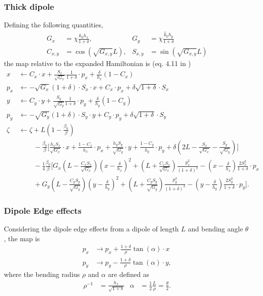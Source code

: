 \subsubsection{Thick dipole}
Defining the following quantities,
\begin{align}
  G_x&= \chi \frac{k_0 h_x}{1+\delta}, & G_y&= \chi \frac{ \hat k_0 h_y}{1+\delta} \\
  C_{x,y}&=\cos(\sqrt{G_{x,y}}L), & S_{x,y}&=\sin(\sqrt{G_{x,y}}L)
\end{align}
the map relative to the expanded Hamiltonian is (eq. 4.11 in \cite{barber87})
\begin{align}
  x   &\leftarrow C_x \cdot x + \frac{S_x}{\sqrt{G_x}}\frac{1}{1+\delta} \cdot p_x + \frac{\delta}{h_x} (1 - C_x) \\
  p_x &\leftarrow -\sqrt{G_x} (1+\delta) \cdot S_x \cdot x + C_x \cdot p_x + \delta \sqrt{1+\delta} \cdot S_x \\
  y   &\leftarrow C_y \cdot y + \frac{S_y}{\sqrt{G_y}}\frac{1}{1+\delta} \cdot p_y + \frac{\delta}{h_y} (1 - C_y) \\
  p_y &\leftarrow -\sqrt{G_y} (1+\delta) \cdot S_y \cdot y + C_y \cdot p_y + \delta \sqrt{1+\delta} \cdot S_y \\
  \zeta &\leftarrow \zeta + L\left(1 - \frac{\beta_0}{\beta}\right) \\
  & \qquad\, -\frac{\beta_0}{\beta} \Bigg[ \frac{h_x S_x}{\sqrt{G_x}} \cdot x + \frac{1-C_x}{h_x} \cdot p_x
  + \frac{h_y S_y}{\sqrt{G_y}} \cdot y + \frac{1-C_y}{h_y} \cdot p_y
  + \delta \left(2L - \frac{S_x}{\sqrt{G_x}} - \frac{S_y}{\sqrt{G_y}} \right) \Bigg] \\
  & \qquad\, - \frac{1}{4}\frac{\beta_0}{\beta} \Bigg[ G_x \left(L-\frac{C_xS_x}{\sqrt{G_x}} \right)
  \left(x - \frac{\delta}{h_x}\right)^2
  + \left(L+\frac{C_xS_x}{\sqrt{G_x}} \right) \frac{p_x^2}{(1+\delta)^2}
  -\left(x-\frac{\delta}{h_x}\right) \frac{2S_x^2}{1+\delta} \cdot p_x \\
  & \qquad\, + G_y \left(L-\frac{C_yS_y}{\sqrt{G_y}} \right)
  \left(y - \frac{\delta}{h_y}\right)^2 + \left(L+\frac{C_yS_y}{\sqrt{G_y}}\right) 
  \frac{p_y^2}{(1+\delta)^2}
  -\left(y-\frac{\delta}{h_y}\right)\frac{2S_y^2}{1+\delta} \cdot p_y \Bigg].
\end{align}

\subsubsection{Dipole Edge effects}
Considering the dipole edge effects from a dipole of length $L$ and bending angle $\theta$, 
the map is
\begin{align*}
    p_x &\to p_x + \frac{1+\delta}{\rho} \tan(\alpha) \cdot x \\
    p_y &\to p_y - \frac{1+\delta}{\rho} \tan(\alpha) \cdot y,
\end{align*}
where the bending radius $\rho$ and $\alpha$ are defined as
\begin{align*}
    \rho^{-1}   &= \frac{h_x}{\sqrt{1+\delta}} &
    \alpha &= \frac{1}{2} \frac{L}{\rho} = \frac{\theta}{2}.
\end{align*}

